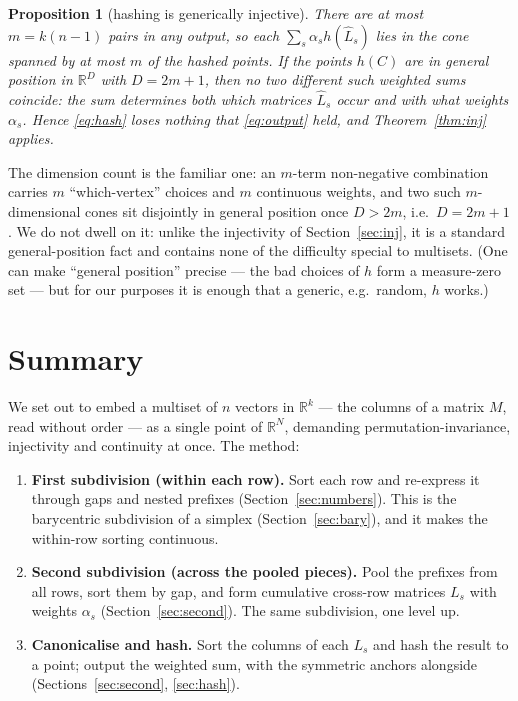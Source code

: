 \documentclass[11pt,a4paper]{article}
\theoremstyle{definition}
\theoremstyle{plain}
\newtheorem{proposition}[definition]{Proposition}
\newcommand{\R}{\mathbb{R}}
\newcommand{\bary}{\widehat}      %
\begin{document}
\begin{proposition}[hashing is generically injective]\label{prop:hash}
There are at most $m=k(n-1)$ pairs in any output, so each $\sum_s\alpha_s
h(\bary L_s)$ lies in the cone spanned by at most $m$ of the hashed points. If
the points $h(C)$ are in general position in $\R^{D}$ with $D=2m+1$, then no two
\emph{different} such weighted sums coincide: the sum determines both which
matrices $\bary L_s$ occur and with what weights $\alpha_s$. Hence
\eqref{eq:hash} loses nothing that \eqref{eq:output} held, and
Theorem~\ref{thm:inj} applies.
\end{proposition}

\noindent
The dimension count is the familiar one: an $m$-term non-negative combination
carries $m$ ``which-vertex'' choices and $m$ continuous weights, and two such
$m$-dimensional cones sit disjointly in general position once $D>2m$, i.e.\
$D=2m+1$. We do not dwell on it: unlike the injectivity of
Section~\ref{sec:inj}, it is a standard general-position fact and contains none
of the difficulty special to multisets. (One can make ``general position''
precise --- the bad choices of $h$ form a measure-zero set --- but for our
purposes it is enough that a generic, e.g.\ random, $h$ works.)

\section{Summary}
\label{sec:summary}

We set out to embed a multiset of $n$ vectors in $\R^k$ --- the columns of a
matrix $M$, read without order --- as a single point of $\R^N$, demanding
permutation-invariance, injectivity and continuity at once. The method:

\begin{enumerate}[leftmargin=*]
\item \textbf{First subdivision (within each row).} Sort each row and re-express
      it through gaps and nested prefixes (Section~\ref{sec:numbers}). This is
      the barycentric subdivision of a simplex (Section~\ref{sec:bary}), and it
      makes the within-row sorting continuous.
\item \textbf{Second subdivision (across the pooled pieces).} Pool the prefixes
      from all rows, sort them by gap, and form cumulative cross-row matrices
      $L_s$ with weights $\alpha_s$ (Section~\ref{sec:second}). The same
      subdivision, one level up.
\item \textbf{Canonicalise and hash.} Sort the columns of each $L_s$ and hash
      the result to a point; output the weighted sum, with the symmetric anchors
      alongside (Sections~\ref{sec:second}, \ref{sec:hash}).
\end{enumerate}
\end{document}

